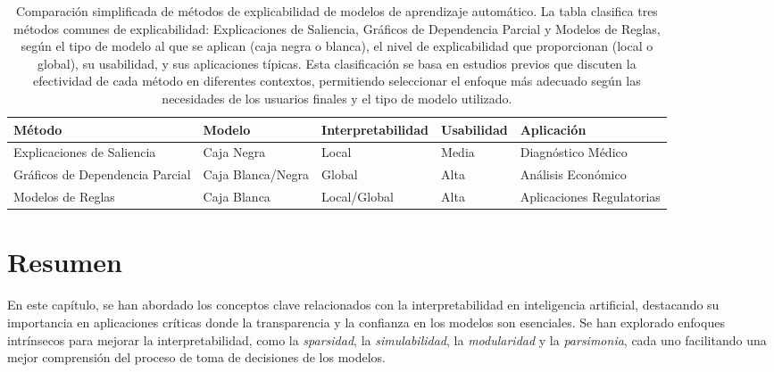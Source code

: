 \begin{table}[H]
    \centering
    \scriptsize %
    \renewcommand{\arraystretch}{1.2} %
    \begin{tabular}{p{3.7cm} p{2.6cm} p{2.5cm} p{1.5cm} p{3.5cm}}
        \toprule
        \textbf{Método} & \textbf{Modelo} & \textbf{Interpretabilidad} & \textbf{Usabilidad} & \textbf{Aplicación} \\
        \midrule
        Explicaciones de Saliencia & Caja Negra & Local & Media & Diagnóstico Médico \\
        Gráficos de Dependencia Parcial & Caja Blanca/Negra & Global & Alta & Análisis Económico \\
        Modelos de Reglas & Caja Blanca & Local/Global & Alta & Aplicaciones Regulatorias \\
        \bottomrule
    \end{tabular}
    \caption{Comparación simplificada de métodos de explicabilidad de modelos de aprendizaje automático. La tabla clasifica tres métodos comunes de explicabilidad: Explicaciones de Saliencia, Gráficos de Dependencia Parcial y Modelos de Reglas, según el tipo de modelo al que se aplican (caja negra o blanca), el nivel de explicabilidad que proporcionan (local o global), su usabilidad, y sus aplicaciones típicas. Esta clasificación se basa en estudios previos \cite{Kaur-2020, doshi2017towards, gilpin2018explaining} que discuten la efectividad de cada método en diferentes contextos, permitiendo seleccionar el enfoque más adecuado según las necesidades de los usuarios finales y el tipo de modelo utilizado.}
    \label{fig:comparacion_metodos_interpretabilidad}
\end{table}

\section{Resumen}

En este capítulo, se han abordado los conceptos clave relacionados con la interpretabilidad en inteligencia artificial, destacando su importancia en aplicaciones críticas donde la transparencia y la confianza en los modelos son esenciales. Se han explorado enfoques intrínsecos para mejorar la interpretabilidad, como la \textit{sparsidad}, la \textit{simulabilidad}, la \textit{modularidad} y la \textit{parsimonia}, cada uno facilitando una mejor comprensión del proceso de toma de decisiones de los modelos.


